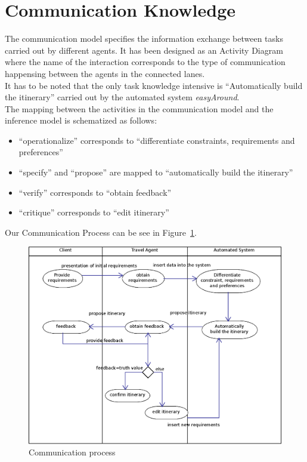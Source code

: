 \documentclass[11pt]{article} %
\begin{document}
\section{Communication Knowledge}
The communication model specifies the information exchange between tasks carried out by different agents. It has been designed as an Activity Diagram where the name of the interaction corresponds to the type of communication happensing between the agents in the connected lanes.\\
It has to be noted that the only task knowledge intensive is ``Automatically build the itinerary'' carried out by the automated system \textit{easyAround}.\\
The mapping between the activities in the communication model and the inference model is schematized as follows:
\begin{itemize}
\item ``operationalize'' corresponds to ``differentiate constraints, requirements and preferences''
\item ``specify'' and ``propose'' are mapped to ``automatically build the itinerary''
\item ``verify'' corresponds to ``obtain feedback''
\item ``critique'' corresponds to ``edit itinerary''
\end{itemize}
Our Communication Process can be see in Figure~\ref{fig:CommunicationDiagram}.

\begin{figure}[h]
\centering
\includegraphics[width=\textwidth]{images/communication.eps}
\caption{Communication process}
\label{fig:CommunicationDiagram}
\end{figure}
\end{document}
